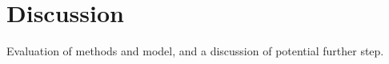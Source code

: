 \chapter{Discussion} \label{chap:discussion}
Evaluation of methods and model, and a discussion of potential further step.